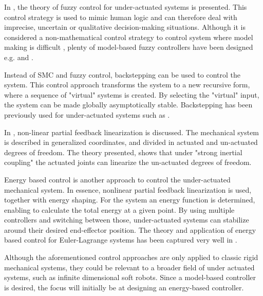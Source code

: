 In \cite{liu2013survey}, the theory of fuzzy control for under-actuated systems is presented. This control strategy is used to mimic human logic and can therefore deal with imprecise, uncertain or qualitative decision-making situations. Although it is considered a non-mathematical control strategy to control system where model making is difficult \cite{michels2007fuzzy}, plenty of model-based fuzzy controllers have been designed e.g. \cite{begovich2002takagi} and \cite{tao2008design}. 

Instead of SMC and fuzzy control, backstepping \cite{khalil2002nonlinear} can be used to control the system. This control approach transforms the system to a new recursive form, where a sequence of "virtual" systems is created. By selecting the "virtual" input, the system can be made globally asymptotically stable. Backstepping has been previously used for under-actuated systems such as \cite{madani2006backstepping}.

In \cite{spong1994linear}, non-linear partial feedback linearization is discussed. The mechanical system is described in generalized coordinates, and divided in actuated and un-actuated degrees of freedom. The theory presented, shows that under "strong inertial coupling" the actuated joints can linearize the un-actuated degrees of freedom. 

Energy based control \cite{spong1996energy} is another approach to control the under-actuated mechanical system. In essence, nonlinear partial feedback linearization is used, together with energy shaping. For the system an energy function is determined, enabling to calculate the total energy at a given point. By using multiple controllers and switching between those, under-actuated systems can stabilize around their desired end-effector position. The theory and application of energy based control for Euler-Lagrange systems has been captured very well in \cite{ortega2013passivity}.


Although the aforementioned control approaches are only applied to classic rigid mechanical systems, they could be relevant to a broader field of under actuated systems, such as infinite dimensional soft robots. Since a model-based controller is desired, the focus will initially be at designing an energy-based controller.




